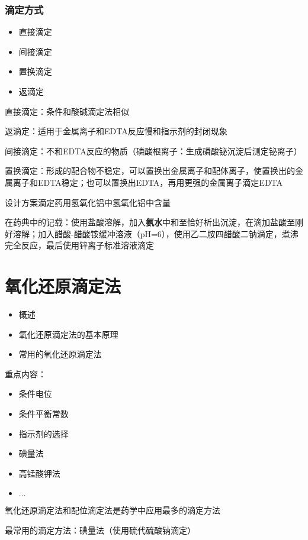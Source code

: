 \subsubsection*{滴定方式}%
\label{subsub:滴定方式}
\begin{itemize}
    \item 直接滴定
    \item 间接滴定
    \item 置换滴定
    \item 返滴定
\end{itemize}
\begin{notation}
直接滴定：条件和酸碱滴定法相似
\end{notation}
\begin{notation}
    返滴定：适用于金属离子和EDTA反应慢和指示剂的封闭现象
\end{notation}
\begin{notation}
间接滴定：不和EDTA反应的物质（磷酸根离子：生成磷酸铋沉淀后测定铋离子）
\end{notation}
\begin{notation}
置换滴定：形成的配合物不稳定，可以置换出金属离子和配体离子，使置换出的金属离子和EDTA稳定；也可以置换出EDTA，再用更强的金属离子滴定EDTA
\end{notation}
\begin{eg}
设计方案滴定药用氢氧化铝中氢氧化铝中含量
\end{eg}
在药典中的记载：使用盐酸溶解，加入\textbf{氨水}中和至恰好析出沉淀，在滴加盐酸至刚好溶解；加入醋酸-醋酸铵缓冲溶液（pH=6），使用乙二胺四醋酸二钠滴定，煮沸完全反应，最后使用锌离子标准溶液滴定
\section{氧化还原滴定法}%
\label{sec:氧化还原滴定法}
\begin{itemize}
    \item 概述
    \item 氧化还原滴定法的基本原理
    \item 常用的氧化还原滴定法
\end{itemize}
重点内容：
\begin{itemize}
    \item 条件电位
    \item 条件平衡常数
    \item 指示剂的选择
    \item 碘量法
    \item 高锰酸钾法
    \item $\ldots $
\end{itemize}
\begin{notation}
氧化还原滴定法和配位滴定法是药学中应用最多的滴定方法
\end{notation}
最常用的滴定方法：碘量法（使用硫代硫酸钠滴定）

